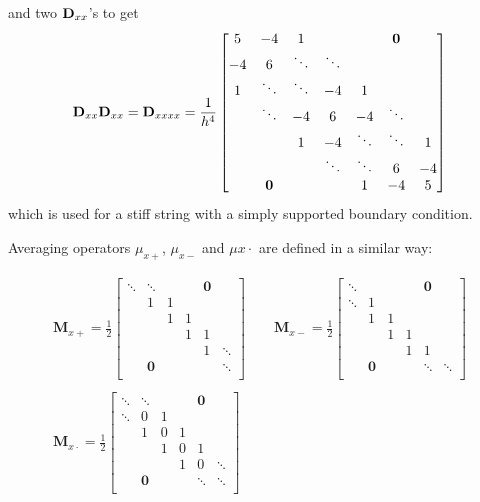 and two $\mathbf{D}_{xx}$'s to get
\begin{equation}
    \mathbf{D}_{xx}\mathbf{D}_{xx} = \mathbf{D}_{xxxx} = \frac{1}{h^4}\begin{bmatrix}
        5& -4 & 1 & & & \mathbf{0}& \\
        -4 & 6 &\ddots &\ddots & & & \\
        1& \ddots & \ddots & -4 & 1 & & \\
        & \ddots& -4 & 6 & -4 & \ddots& \\
        & & 1 & -4 & \ddots & \ddots &1 \\
        & & & \ddots & \ddots & 6 & -4 \\
        & \mathbf{0} & & & 1& -4 & 5 \\
    \end{bmatrix}
\end{equation}
which is used for a stiff string with a simply supported boundary condition.

Averaging operators $\mu_{x+}$, $\mu_{x-}$ and $\mu{x\cdot}$ are defined in a similar way:

\begin{gather*}
    \mathbf{M}_{x+} = \frac{1}{2}\begin{bmatrix}
        \ddots &\ddots & & & \mathbf{0}&\\
         & 1 & 1 & & & \\
        & & 1 & 1 & & \\
        & & & 1 & 1 & \\
        & & & & 1 & \ddots\\
        &\mathbf{0} & & & & \ddots \\
    \end{bmatrix}
    \qquad
    \mathbf{M}_{x-} = \frac{1}{2}\begin{bmatrix}
        \ddots & & & & \mathbf{0}&\\
        \ddots & 1 & & & & \\
        & 1 & 1 & & & \\
        & & 1 & 1 & & \\
        & & & 1 & 1 & \\
        &\mathbf{0} & & & \ddots & \ddots \\
    \end{bmatrix}\\
    \\
    \mathbf{M}_{x\cdot} = \frac{1}{2}\begin{bmatrix}
        \ddots &\ddots & & & \mathbf{0}&\\
        \ddots & 0 & 1 & & & \\
        & 1 & 0 & 1 & & \\
        & & 1 & 0 & 1 & \\
        & & & 1 & 0 & \ddots \\
        &\mathbf{0} & & & \ddots & \ddots \\
    \end{bmatrix}\\
\end{gather*}

